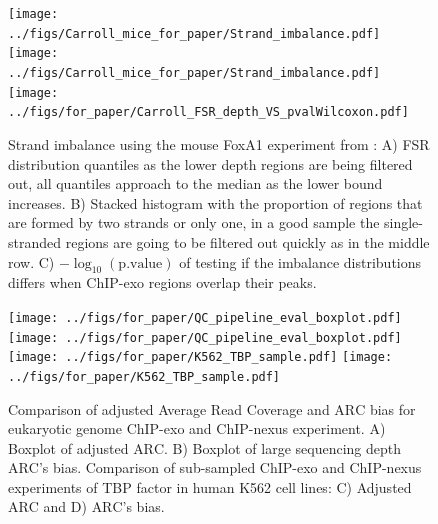 \documentclass{bmcart}\usepackage[]{graphicx}\usepackage[]{color}
\begin{document}
\newpage

\begin{figure}[h!]
  \centering  
  \texttt{[image: ../figs/Carroll\_mice\_for\_paper/Strand\_imbalance.pdf]} 
  \newline
  \texttt{[image: ../figs/Carroll\_mice\_for\_paper/Strand\_imbalance.pdf]} 
  \texttt{[image: ../figs/for\_paper/Carroll\_FSR\_depth\_VS\_pvalWilcoxon.pdf]}
  \caption{Strand imbalance using the mouse FoxA1 experiment from
    \cite{exoillumina}: A) FSR distribution quantiles as the lower
    depth regions are being filtered out, all quantiles approach to
    the median as the lower bound increases. B) Stacked histogram with
    the proportion of regions that are formed by two strands or only
    one, in a good sample the single-stranded regions are going to be
    filtered out quickly as in the middle row. C)
    $-\log_{10}(\text{p.value})$ of testing if the imbalance
    distributions differs when ChIP-exo regions overlap their peaks.}
  \label{fig:strand}
\end{figure}

\newpage

\begin{figure}[h!]
  \centering
  \texttt{[image: ../figs/for\_paper/QC\_pipeline\_eval\_boxplot.pdf]}
\newline
  \texttt{[image: ../figs/for\_paper/QC\_pipeline\_eval\_boxplot.pdf]}
\newline
  \texttt{[image: ../figs/for\_paper/K562\_TBP\_sample.pdf]}
  \texttt{[image: ../figs/for\_paper/K562\_TBP\_sample.pdf]}
  \caption{Comparison of adjusted Average Read Coverage and
    $\mbox{ARC}$ bias for eukaryotic genome ChIP-exo and ChIP-nexus
    experiment. A) Boxplot of adjusted $\mbox{ARC}$. B) Boxplot of
    large sequencing depth $\mbox{ARC}$'s bias. Comparison of
    sub-sampled ChIP-exo and ChIP-nexus experiments of TBP factor in
    human K562 cell lines: C) Adjusted $\mbox{ARC}$ and D) $\mbox{ARC}$'s
    bias.}
  \label{fig:eval}
\end{figure}

\end{document}
